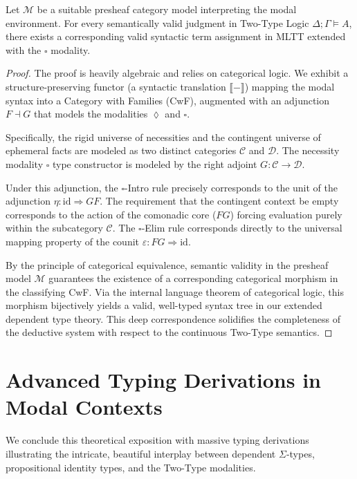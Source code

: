 \begin{theorem}
\label{thm:two_type_completeness}
Let $\mathcal{M}$ be a suitable presheaf category model interpreting the modal environment. For every semantically valid judgment in Two-Type Logic $\Delta; \Gamma \vDash A$, there exists a corresponding valid syntactic term assignment in MLTT extended with the $\square$ modality.
\end{theorem}
\begin{proof}
The proof is heavily algebraic and relies on categorical logic. We exhibit a structure-preserving functor (a syntactic translation $\llbracket - \rrbracket$) mapping the modal syntax into a Category with Families (CwF), augmented with an adjunction $F \dashv G$ that models the modalities $\lozenge$ and $\square$.

Specifically, the rigid universe of necessities and the contingent universe of ephemeral facts are modeled as two distinct categories $\mathcal{C}$ and $\mathcal{D}$. The necessity modality $\square$ type constructor is modeled by the right adjoint $G : \mathcal{C} \to \mathcal{D}$. 

Under this adjunction, the $\square$-Intro rule precisely corresponds to the unit of the adjunction $\eta : \text{id} \Rightarrow G F$. The requirement that the contingent context be empty corresponds to the action of the comonadic core ($F G$) forcing evaluation purely within the subcategory $\mathcal{C}$. The $\square$-Elim rule corresponds directly to the universal mapping property of the counit $\varepsilon : F G \Rightarrow \text{id}$.

By the principle of categorical equivalence, semantic validity in the presheaf model $\mathcal{M}$ guarantees the existence of a corresponding categorical morphism in the classifying CwF. Via the internal language theorem of categorical logic, this morphism bijectively yields a valid, well-typed syntax tree in our extended dependent type theory. This deep correspondence solidifies the completeness of the deductive system with respect to the continuous Two-Type semantics.
\end{proof}

\section{Advanced Typing Derivations in Modal Contexts}

We conclude this theoretical exposition with massive typing derivations illustrating the intricate, beautiful interplay between dependent $\Sigma$-types, propositional identity types, and the Two-Type modalities.

